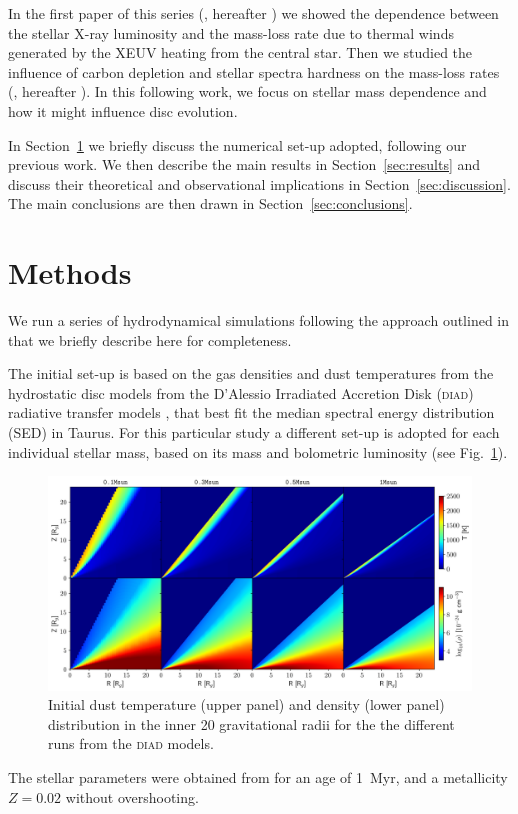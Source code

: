 \documentclass[usenatbib,useAMS,usedcolumn]{mnras}
\begin{document}
In the first paper of this series (, hereafter ) we showed the dependence between the stellar X-ray luminosity and the mass-loss rate due to thermal winds generated by the XEUV heating from the central star. Then we studied the influence of carbon depletion  and stellar spectra hardness on the mass-loss rates (, hereafter ). In this following work, we focus on stellar mass dependence and how it might influence disc evolution.

In Section~\ref{sec:methods} we briefly discuss the numerical set-up adopted, following our previous work. We then describe the main results in Section~\ref{sec:results} and discuss their theoretical and observational implications in Section~\ref{sec:discussion}. The main conclusions are then drawn in Section~\ref{sec:conclusions}.

\section{Methods}\label{sec:methods}
We run a series of hydrodynamical simulations following the approach outlined in  that we briefly describe here for completeness.

The initial set-up is based on the gas densities and dust temperatures from the hydrostatic disc models from the D’Alessio Irradiated Accretion Disk (\textsc{diad}) radiative transfer models , that best fit the median spectral energy distribution (SED) in Taurus. 
For this particular study a different set-up is adopted for each individual stellar mass, based on its mass and bolometric luminosity (see Fig.~\ref{fig:initdiscs}).
\begin{figure}
    \centering
    \includegraphics[width=\textwidth]{Figure1}
    \caption{Initial dust temperature (upper panel) and density (lower panel) distribution in the inner 20 gravitational radii for the the different runs from the \textsc{diad} models. \label{fig:initdiscs}}
\end{figure}
The stellar parameters were obtained from  for an age of \SI{1}{Myr}, and a metallicity $Z=0.02$ without overshooting.
\end{document}
